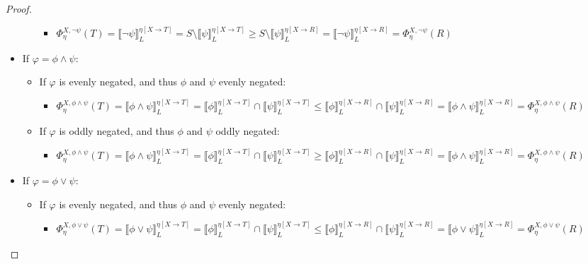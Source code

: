 \documentclass[11pt]{article}
\theoremstyle{definition}
\theoremstyle{plain}
\let\temp\phi
\let\phi\varphi
\let\varphi\temp
\begin{document}
\begin{appendices}
\begin{proof}
\begin{itemize}
\begin{itemize}
\begin{itemize}
\item $ \Phi_{\eta}^{X,\neg\psi}(T) = \llbracket \neg\psi \rrbracket_L^{\eta[X\rightarrow T]} = S\setminus\llbracket \psi \rrbracket_L^{\eta[X\rightarrow T]} \geq S\setminus\llbracket \psi \rrbracket_L^{\eta[X\rightarrow R]} = \llbracket \neg\psi \rrbracket_L^{\eta[X\rightarrow R]} = \Phi_{\eta}^{X,\neg\psi}(R)$
\end{itemize}
\end{itemize}
\item If $ \phi = \varphi \wedge \psi $:
\begin{itemize}
\item If $ \phi $ is evenly negated, and thus $ \varphi $ and $ \psi $ evenly negated:
\begin{itemize}
\item $ \Phi_{\eta}^{X,\varphi \wedge \psi}(T) = \llbracket \varphi \wedge \psi \rrbracket_L^{\eta[X\rightarrow T]} = \llbracket \varphi \rrbracket_L^{\eta[X\rightarrow T]} \cap \llbracket \psi \rrbracket_L^{\eta[X\rightarrow T]} \leq \llbracket \varphi \rrbracket_L^{\eta[X\rightarrow R]} \cap \llbracket \psi \rrbracket_L^{\eta[X\rightarrow R]} = \llbracket \varphi \wedge \psi \rrbracket_L^{\eta[X\rightarrow R]} = \Phi_{\eta}^{X,\varphi \wedge \psi}(R)$
\end{itemize}
\item If $ \phi $ is oddly negated, and thus $ \varphi $ and $ \psi $ oddly negated:
\begin{itemize}
\item $ \Phi_{\eta}^{X,\varphi \wedge \psi}(T) = \llbracket \varphi \wedge \psi \rrbracket_L^{\eta[X\rightarrow T]} = \llbracket \varphi \rrbracket_L^{\eta[X\rightarrow T]} \cap \llbracket \psi \rrbracket_L^{\eta[X\rightarrow T]} \geq \llbracket \varphi \rrbracket_L^{\eta[X\rightarrow R]} \cap \llbracket \psi \rrbracket_L^{\eta[X\rightarrow R]} = \llbracket \varphi \wedge \psi \rrbracket_L^{\eta[X\rightarrow R]} = \Phi_{\eta}^{X,\varphi \wedge \psi}(R)$
\end{itemize}
\end{itemize}
\item If $ \phi = \varphi \vee \psi $:
\begin{itemize}
\item If $ \phi $ is evenly negated, and thus $ \varphi $ and $ \psi $ evenly negated:
\begin{itemize}
\item $ \Phi_{\eta}^{X,\varphi \vee \psi}(T) = \llbracket \varphi \vee \psi \rrbracket_L^{\eta[X\rightarrow T]} = \llbracket \varphi \rrbracket_L^{\eta[X\rightarrow T]} \cap \llbracket \psi \rrbracket_L^{\eta[X\rightarrow T]} \leq \llbracket \varphi \rrbracket_L^{\eta[X\rightarrow R]} \cap \llbracket \psi \rrbracket_L^{\eta[X\rightarrow R]} = \llbracket \varphi \vee \psi \rrbracket_L^{\eta[X\rightarrow R]} = \Phi_{\eta}^{X,\varphi \vee \psi}(R)$

\end{itemize}
\end{itemize}
\end{itemize}
\end{proof}
\end{appendices}
\end{document}
